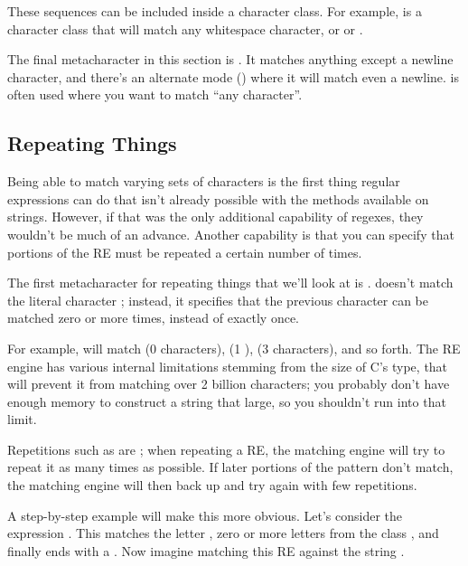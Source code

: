 \documentclass{howto}
\begin{document}
These sequences can be included inside a character class.  For
example, \regexp{[\e s,.]} is a character class that will match any
whitespace character, or \character{,} or .

The final metacharacter in this section is .  It matches
anything except a newline character, and there's an alternate mode
() where it will match even a newline.  
is often used where you want to match ``any character''.  

\subsection{Repeating Things}

Being able to match varying sets of characters is the first thing
regular expressions can do that isn't already possible with the
methods available on strings.  However, if that was the only
additional capability of regexes, they wouldn't be much of an advance.
Another capability is that you can specify that portions of the RE
must be repeated a certain number of times.

The first metacharacter for repeating things that we'll look at is
\regexp{*}.  \regexp{*} doesn't match the literal character \samp{*};
instead, it specifies that the previous character can be matched zero
or more times, instead of exactly once.

For example,  will match  (0 
characters),  (1 ),  (3 
characters), and so forth.  The RE engine has various internal
limitations stemming from the size of C's  type, that will
prevent it from matching over 2 billion  characters; you
probably don't have enough memory to construct a string that large, so
you shouldn't run into that limit.

Repetitions such as \regexp{*} are ; when repeating a RE,
the matching engine will try to repeat it as many times as possible.
If later portions of the pattern don't match, the matching engine will
then back up and try again with few repetitions.

A step-by-step example will make this more obvious.  Let's consider
the expression .  This matches the letter
, zero or more letters from the class \code{[bcd]}, and
finally ends with a .  Now imagine matching this RE
against the string .  
\end{document}
